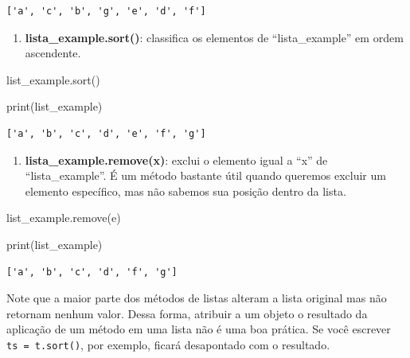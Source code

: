 \documentclass[
  brazilian,
  letterpaper,
  DIV=11,
  numbers=noendperiod]{scrreprt}
\newenvironment{Shaded}{\begin{snugshade}}{\end{snugshade}}
\newcommand{\BuiltInTok}[1]{\textcolor[rgb]{0.00,0.23,0.31}{#1}}
\newcommand{\NormalTok}[1]{\textcolor[rgb]{0.00,0.23,0.31}{#1}}
\newcommand{\StringTok}[1]{\textcolor[rgb]{0.13,0.47,0.30}{#1}}
\providecommand{\tightlist}{%
  \setlength{\itemsep}{0pt}\setlength{\parskip}{0pt}}
\begin{document}
\begin{verbatim}
['a', 'c', 'b', 'g', 'e', 'd', 'f']
\end{verbatim}

\begin{enumerate}
\def\labelenumi{\arabic{enumi}.}
\setcounter{enumi}{2}
\tightlist
\item
  \textbf{lista\_example.sort()}: classifica os elementos de
  ``lista\_example'' em ordem ascendente.
\end{enumerate}

\begin{Shaded}
\begin{Highlighting}[]
\NormalTok{list\_example.sort()}

\BuiltInTok{print}\NormalTok{(list\_example)}
\end{Highlighting}
\end{Shaded}

\begin{verbatim}
['a', 'b', 'c', 'd', 'e', 'f', 'g']
\end{verbatim}

\begin{enumerate}
\def\labelenumi{\arabic{enumi}.}
\setcounter{enumi}{3}
\tightlist
\item
  \textbf{lista\_example.remove(x)}: exclui o elemento igual a ``x'' de
  ``lista\_example''. É um método bastante útil quando queremos excluir
  um elemento específico, mas não sabemos sua posição dentro da lista.
\end{enumerate}

\begin{Shaded}
\begin{Highlighting}[]
\NormalTok{list\_example.remove(}\StringTok{\textquotesingle{}e\textquotesingle{}}\NormalTok{)}

\BuiltInTok{print}\NormalTok{(list\_example)}
\end{Highlighting}
\end{Shaded}

\begin{verbatim}
['a', 'b', 'c', 'd', 'f', 'g']
\end{verbatim}

Note que a maior parte dos métodos de listas alteram a lista original
mas não retornam nenhum valor. Dessa forma, atribuir a um objeto o
resultado da aplicação de um método em uma lista não é uma boa prática.
Se você escrever \texttt{ts\ =\ t.sort()}, por exemplo, ficará
desapontado com o resultado.
\end{document}
